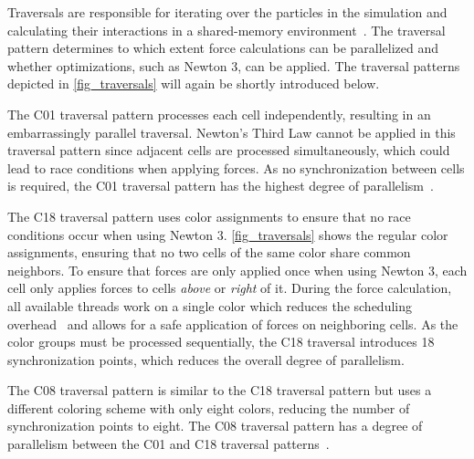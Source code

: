 \documentclass[conference]{IEEEtran}
\begin{document}
\begin{description}[style=nextline]
    \item[Traversal]
        Traversals are responsible for iterating over the particles in the simulation and calculating their interactions in a shared-memory environment~\cite{SECKLER2021101296}. The traversal pattern determines to which extent force calculations can be parallelized and whether optimizations, such as Newton 3, can be applied. The traversal patterns depicted in \autoref{fig_traversals} will again be shortly introduced below.

        \begin{description}[style=nextline, font=\itshape\mdseries]
            \item[$\bullet$ C01]
                The C01 traversal pattern processes each cell independently, resulting in an embarrassingly parallel traversal. Newton's Third Law cannot be applied in this traversal pattern since adjacent cells are processed simultaneously, which could lead to race conditions when applying forces. As no synchronization between cells is required, the C01 traversal pattern has the highest degree of parallelism~\cite{NEWCOME2023115278}.
            \item[$\bullet$ C18]
                The C18 traversal pattern uses color assignments to ensure that no race conditions occur when using Newton 3. \autoref{fig_traversals} shows the regular color assignments, ensuring that no two cells of the same color share common neighbors. To ensure that forces are only applied once when using Newton 3, each cell only applies forces to cells \textit{above} or \textit{right} of it. During the force calculation, all available threads work on a single color which reduces the scheduling overhead~\cite{NEWCOME2023115278} and allows for a safe application of forces on neighboring cells. As the color groups must be processed sequentially, the C18 traversal introduces 18 synchronization points, which reduces the overall degree of parallelism\cite{NEWCOME2023115278}.

            \item[$\bullet$ C08]
                The C08 traversal pattern is similar to the C18 traversal pattern but uses a different coloring scheme with only eight colors, reducing the number of synchronization points to eight. The C08 traversal pattern has a degree of parallelism between the C01 and C18 traversal patterns~\cite{NEWCOME2023115278}.
        \end{description}


\end{description}
\end{document}

